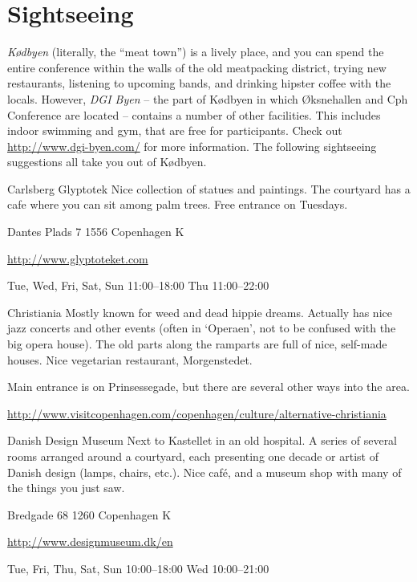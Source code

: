 \section{Sightseeing}
\textit{Kødbyen} (literally, the ``meat town'') is a lively place, and you can spend the entire conference within the walls of the old meatpacking district, trying new restaurants, listening to upcoming bands, and drinking hipster coffee with the locals. However, \textit{DGI Byen} – the part of Kødbyen in which Øksnehallen and Cph Conference are located – contains a number of other facilities. This includes indoor swimming and gym, that are free for participants. Check out \url{http://www.dgi-byen.com/} for more information. The following sightseeing suggestions all take you out of Kødbyen.
\par
\bigskip
\begin{funitem}
{Carlsberg Glyptotek}
{Nice collection of statues and paintings. The courtyard has a cafe where you can sit among palm trees. Free entrance on Tuesdays.}
{\begin{addr}
{Dantes Plads 7}
{1556 Copenhagen K}
\end{addr}}
{\url{http://www.glyptoteket.com}}
{\begin{ohours}
{Tue, Wed, Fri, Sat, Sun}
{11:00–18:00}
{Thu}
{11:00–22:00}
{}
{}
{}
{}
\end{ohours}}
\end{funitem}
\begin{funitemshortaddr}
{Christiania}
{Mostly known for weed and dead hippie dreams. Actually has nice jazz concerts and other events (often in ‘Operaen’, not to be confused with the big opera house). The old parts along the ramparts are full of nice, self-made houses. Nice vegetarian restaurant, Morgenstedet. }
{\begin{shortaddr}
{Main entrance is on Prinsessegade, but there are several other ways into the area.}
\end{shortaddr}}
{\url{http://www.visitcopenhagen.com/copenhagen/culture/alternative-christiania }}
\end{funitemshortaddr}
\begin{funitem}
{Danish Design Museum}
{Next to Kastellet in an old hospital. A series of several rooms arranged around a courtyard, each presenting one decade or artist of Danish design (lamps, chairs, etc.). Nice café, and a museum shop with many of the things you just saw.}
{\begin{addr}
{Bredgade 68}
{1260 Copenhagen K}
\end{addr}}
{\url{http://www.designmuseum.dk/en}}
{\begin{ohours}
{Tue, Fri, Thu, Sat, Sun}
{10:00–18:00}
{Wed}
{10:00–21:00}
{}
{}
{}
{}
\end{ohours}}
\end{funitem}
